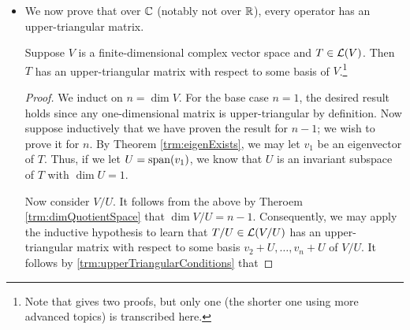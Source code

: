 \documentclass[../main.tex]{subfiles}
\begin{document}
\begin{itemize}
\begin{theorem}
\begin{proof}
            Suppose first that the matrix of $T$ with respect to $v_1,\dots,v_n$ is upper triangular. Let $j\in\{1,\dots,n\}$ be arbitrary. By the definition of $\mat{T}$, $Tv_j=A_{1,j}v_1+\cdots+A_{n,j}v_n$. Additionally, since $\mat{T}$ is upper triangular, we know that $A_{j+1,j}=\cdots=A_{n,j}=0$. Therefore, $Tv_j=A_{1,j}v_1+\cdots+A_{j,j}v_j\in\spn(v_1,\dots,v_j)$, as desired. The proof is symmetric in the other direction.\par
            Now suppose that $Tv_j\in\spn(v_1,\dots,v_j)$ for each $j=1,\dots,n$. Fix $j\in\{1,\dots,n\}$. Let $v\in\spn(v_1,\dots,v_j)$. It follows since $Tv_i\in\spn(v_1,\dots,v_i)\subset\spn(v_1,\dots,v_j)$ for all $i=1,\dots,j$ by hypothesis that
            \begin{align*}
                Tv &= T(a_1v_1+\cdots+a_jv_j)\\
                &= a_1Tv_1+\cdots+a_jTv_j\\
                &\in \spn(v_1,\dots,v_j)
            \end{align*}
            as desired. On the other hand, suppose $\spn(v_1,\dots,v_j)$ is invariant under $T$ for each $j=1,\dots,n$. Fix $j\in\{1,\dots,n\}$. Then by the definition of invariance, $v_j\in\spn(v_1,\dots,v_j)$ implies that $Tv_j\in\spn(v_1,\dots,v_j)$, as desired.
        \end{proof}
    \end{theorem}
    \item We now prove that over $\mathbb{C}$ (notably not over $\mathbb{R}$), every operator has an upper-triangular matrix.
    \begin{theorem}
        Suppose $V$ is a finite-dimensional complex vector space and $T\in\mathcal{L}(V)$. Then $T$ has an upper-triangular matrix with respect to some basis of $V$.\footnote{Note that \textcite{bib:Axler} gives two proofs, but only one (the shorter one using more advanced topics) is transcribed here.}
        \begin{proof}
            We induct on $n=\dim V$. For the base case $n=1$, the desired result holds since any one-dimensional matrix is upper-triangular by definition. Now suppose inductively that we have proven the result for $n-1$; we wish to prove it for $n$. By Theorem \ref{trm:eigenExists}, we may let $v_1$ be an eigenvector of $T$. Thus, if we let $U=\operatorname{span}(v_1)$, we know that $U$ is an invariant subspace of $T$ with $\dim U=1$.\par
            Now consider $V/U$. It follows from the above by Theroem \ref{trm:dimQuotientSpace} that $\dim V/U=n-1$. Consequently, we may apply the inductive hypothesis to learn that $T/U\in\mathcal{L}(V/U)$ has an upper-triangular matrix with respect to some basis $v_2+U,\dots,v_n+U$ of $V/U$. It follows by \ref{trm:upperTriangularConditions} that

\end{proof}
\end{theorem}
\end{itemize}
\end{document}
